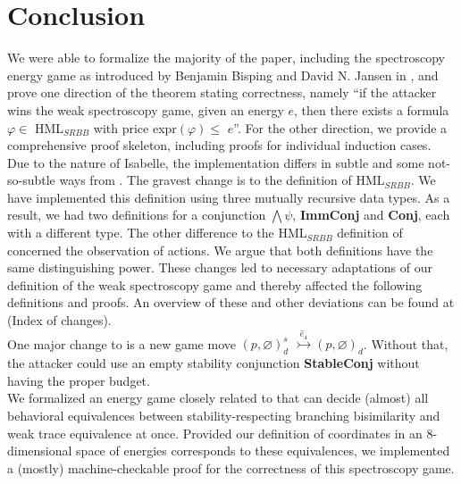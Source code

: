 \section{Conclusion}
We were able to formalize the majority of the paper, including the spectroscopy energy game as introduced by Benjamin Bisping and David N. Jansen in \cite{bisping2023lineartimebranchingtime}, 
and prove one direction of the theorem stating correctness, namely ``if the attacker wins the weak spectroscopy game, given an energy $e$, then there exists a formula $\varphi \in$ HML$_{SRBB}$ with price expr$(\varphi) \leq$ $e$''. 
For the other direction, we provide a comprehensive proof skeleton, including proofs for individual induction cases.
\\
Due to the nature of Isabelle, the implementation differs in subtle and some not-so-subtle ways from \cite{bisping2023lineartimebranchingtime}. The gravest change is to the definition of HML$_{SRBB}$. 
We have implemented this definition using three mutually recursive data types. As a result, we had two definitions for a conjunction $\bigwedge\psi$, \textbf{ImmConj} and \textbf{Conj}, each with a different type. 
The other difference to the HML$_{SRBB}$ definition of \cite{bisping2023lineartimebranchingtime} concerned the observation of actions. 
We argue that both definitions have the same distinguishing power. 
These changes led to necessary adaptations of our definition of the weak spectroscopy game and thereby affected the following definitions and proofs.
An overview of these and other deviations can be found at (Index of changes). 
\\
One major change to \cite{bisping2023lineartimebranchingtime} is a new game move $(p,\varnothing)_{d}^{s}$ $\overset{\hat{e}_4}{\rightarrowtail} (p,\varnothing)_d$. 
Without that, the attacker could use an empty stability conjunction \textbf{StableConj} without having the proper budget. 
\\
We formalized an energy game closely related to \cite{bisping2023lineartimebranchingtime} that can decide (almost) all behavioral equivalences between stability-respecting branching bisimilarity and weak trace equivalence at once.
Provided our definition of coordinates in an 8-dimensional space of energies corresponds to these equivalences, we implemented a (mostly) machine-checkable proof for the correctness of this spectroscopy game.